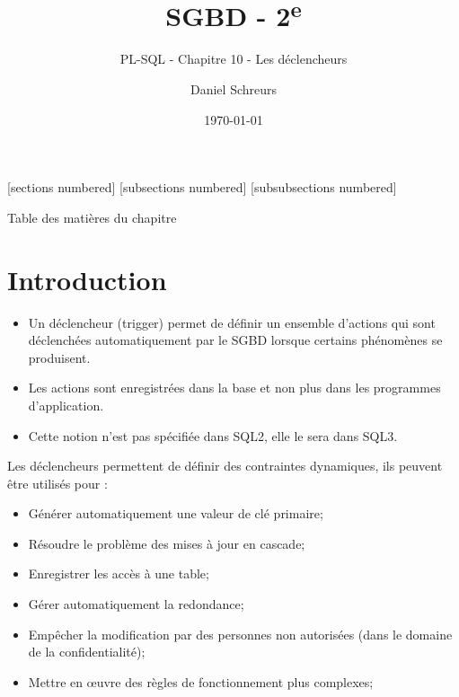 \documentclass[10pt]{beamer}
\title{SGBD - 2\textsuperscript{e}}
\subtitle{PL-SQL - Chapitre 10 - Les déclencheurs}
\date{\today}
\author{Daniel Schreurs}
\institute{Haute École de Province de Liège}
\begin{document}
\maketitle

[sections numbered]
[subsections numbered]
[subsubsections numbered]
\begin{frame}[allowframebreaks]{Table des matières du chapitre}
    \tableofcontents[subsectionstyle=show/show/hide,subsubsectionstyle=show/show/hide,]
\end{frame}

\section{Introduction}
\begin{frame}{\secname}
    \begin{itemize}
        \item Un déclencheur (trigger) permet de définir un ensemble d'actions qui sont déclenchées automatiquement par le SGBD lorsque certains phénomènes se produisent.
        \item Les actions sont enregistrées dans la base et non plus dans les programmes d'application.
        \item Cette notion n'est pas spécifiée dans SQL2, elle le sera dans SQL3.
    \end{itemize}
\end{frame}

\begin{frame}{\secname}
    Les déclencheurs permettent de définir des contraintes dynamiques, ils peuvent être utilisés pour :
    \begin{itemize}
        \item Générer automatiquement une valeur de clé primaire;
        \item Résoudre le problème des mises à jour en cascade;
        \item Enregistrer les accès à une table;
        \item Gérer automatiquement la redondance;
        \item Empêcher la modification par des personnes non autorisées (dans le domaine de la confidentialité);
        \item Mettre en œuvre des règles de fonctionnement plus complexes;
    \end{itemize}
\end{frame}
\end{document}
